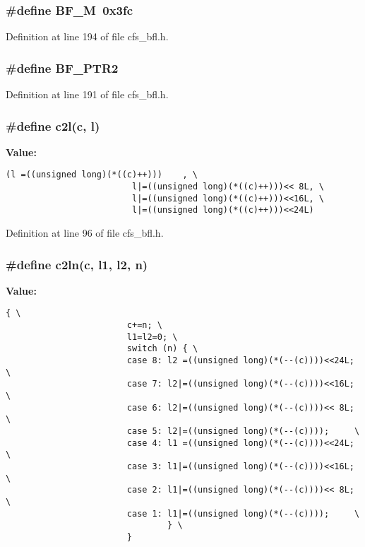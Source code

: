 \subsubsection{\setlength{\rightskip}{0pt plus 5cm}\#define BF\_\-M\ 0x3fc}\label{cfs__bfl_8h_a9}




Definition at line 194 of file cfs\_\-bfl.h.
\subsubsection{\setlength{\rightskip}{0pt plus 5cm}\#define BF\_\-PTR2}\label{cfs__bfl_8h_a8}




Definition at line 191 of file cfs\_\-bfl.h.
\subsubsection{\setlength{\rightskip}{0pt plus 5cm}\#define c2l({\bf c}, {\bf l})}\label{cfs__bfl_8h_a0}


{\bf Value:}

\footnotesize\begin{verbatim}(l =((unsigned long)(*((c)++)))    , \
                         l|=((unsigned long)(*((c)++)))<< 8L, \
                         l|=((unsigned long)(*((c)++)))<<16L, \
                         l|=((unsigned long)(*((c)++)))<<24L)
\end{verbatim}\normalsize 


Definition at line 96 of file cfs\_\-bfl.h.
\subsubsection{\setlength{\rightskip}{0pt plus 5cm}\#define c2ln({\bf c}, l1, l2, {\bf n})}\label{cfs__bfl_8h_a1}


{\bf Value:}

\footnotesize\begin{verbatim}{ \
                        c+=n; \
                        l1=l2=0; \
                        switch (n) { \
                        case 8: l2 =((unsigned long)(*(--(c))))<<24L; \
                        case 7: l2|=((unsigned long)(*(--(c))))<<16L; \
                        case 6: l2|=((unsigned long)(*(--(c))))<< 8L; \
                        case 5: l2|=((unsigned long)(*(--(c))));     \
                        case 4: l1 =((unsigned long)(*(--(c))))<<24L; \
                        case 3: l1|=((unsigned long)(*(--(c))))<<16L; \
                        case 2: l1|=((unsigned long)(*(--(c))))<< 8L; \
                        case 1: l1|=((unsigned long)(*(--(c))));     \
                                } \
                        }
\end{verbatim}\normalsize 


